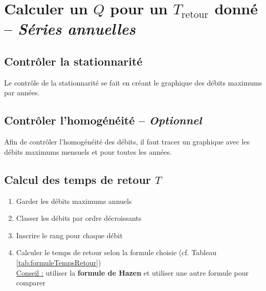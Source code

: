 \chapter{Calculer un $Q$ pour un $T_\text{retour}$ donné -- \textit{Séries annuelles}} \label{app:seriesAnnuelles}



\section{Contrôler la stationnarité} \label{sec:controleStationnarite}
Le contrôle de la stationnarité se fait en créant le graphique des débits maximums par années. \\


\section{Contrôler l'homogénéité -- \textit{Optionnel}}
Afin de contrôler l'homogénéité des débits, il faut tracer un graphique avec les débits maximums mensuels et pour toutes les années. \\


\section{Calcul des temps de retour $T$} \label{sec:calculTempsRetour}
\begin{enumerate}
    \item Garder les débits maximums annuels
    \item Classer les débits par ordre décroissants
    \item Inscrire le rang pour chaque débit
    \item Calculer le temps de retour selon la formule choisie (cf. Tableau \ref{tab:formuleTempsRetour}) \\
    \underline{Conseil :} utiliser la \textbf{{\color{red} formule de Hazen}} et utiliser une autre formule pour comparer
\end{enumerate}


